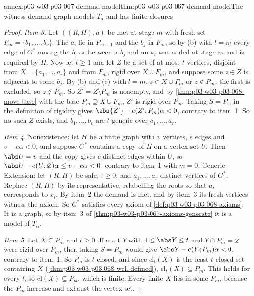\begin{annexitem}{annex:p03-w03-p03-067-demand-model}{thm:p03-w03-p03-067-demand-model}{The witness-demand graph models \(T_\alpha\) and has finite closures}
\begin{proof}
\emph{Item 3.}  Let \(((R,H),\bar a)\) be met at stage \(m\) with fresh set
\(F_m=\{b_1,\ldots,b_v\}\).  The \(a_i\) lie in \(P_{m-1}\) and the \(b_j\)
in \(F_m\), so by (b) with \(l=m\) every edge of \(G^\ast\) among the \(b_j\) or
between a \(b_j\) and an \(a_i\) was added at stage \(m\) and is required by
\(H\).  Now let \(t\geq1\) and let \(Z\) be a set of at most \(t\) vertices,
disjoint from \(X=\{a_1,\ldots,a_r\}\) and from \(F_m\), rigid over
\(X\cup F_m\), and suppose some \(z\in Z\) is adjacent to some \(b_j\).  By
(b) and (c) with \(l=m\), \(z\in X\cup F_m\) or \(z\notin P_m\); the first is excluded, so
\(z\notin P_m\).  So \(Z'=Z\setminus P_m\) is nonempty, and by
\cref{thm:p03-w03-p03-068-move-base} with the base \(P_m\supseteq
X\cup F_m\), \(Z'\) is rigid over \(P_m\).  Taking \(S=P_m\) in the
definition of rigidity gives \(\abs{Z'}-e(Z';P_m)\alpha<0\), contrary to
item~1.  So no such \(Z\) exists, and \(b_1,\ldots,b_v\) are \(t\)-generic
over \(a_1,\ldots,a_r\).

\emph{Item 4.}  Nonexistence: let \(H\) be a finite graph with \(v\)
vertices, \(e\) edges and \(v-e\alpha<0\), and suppose \(G^\ast\) contains a
copy of \(H\) on a vertex set \(U\).  Then \(\abs U=v\) and the copy gives
\(e\) distinct edges within \(U\), so
\(\abs U-e(U;\varnothing)\alpha\leq v-e\alpha<0\), contrary to item~1 with
\(m=0\).  Generic Extension: let \((R,H)\) be safe, \(t\geq0\), and
\(a_1,\ldots,a_r\) distinct vertices of \(G^\ast\).  Replace \((R,H)\) by its
representative, relabelling the roots so that \(a_i\) corresponds to
\(x_i\).  By item~2 the demand is met, and by item~3 its fresh vertices
witness the axiom.  So \(G^\ast\) satisfies every axiom of
\cref{def:p03-w03-p03-068-axioms}.  It is a graph, so by item~3 of
\cref{thm:p03-w03-p03-067-axioms-generate} it is a model of
\(T_\alpha\).

\emph{Item 5.}  Let \(X\subseteq P_m\) and \(t\geq0\).  If a set \(Y\) with
\(1\leq\abs Y\leq t\) and \(Y\cap P_m=\varnothing\) were rigid over \(P_m\),
then taking \(S=P_m\) would give \(\abs Y-e(Y;P_m)\alpha<0\), contrary to
item~1.  So \(P_m\) is \(t\)-closed, and since \(\mathrm{cl}_t(X)\) is the
least \(t\)-closed set containing \(X\)
(\cref{thm:p03-w03-p03-068-well-defined}), \(\mathrm{cl}_t(X)\subseteq P_m\).
This holds for every \(t\), so \(\mathrm{cl}(X)\subseteq P_m\), which is
finite.  Every finite \(X\) lies in some \(P_m\), because the \(P_m\)
increase and exhaust the vertex set.
\end{proof}
\end{annexitem}

